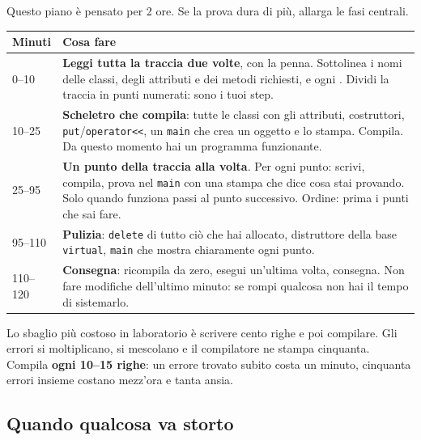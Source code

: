 Questo piano è pensato per 2 ore. Se la prova dura di più, allarga le fasi centrali.

\begin{center}\small
\begin{tabular}{lp{11cm}}
\toprule
\textbf{Minuti} & \textbf{Cosa fare} \\
\midrule
0--10 & \textbf{Leggi tutta la traccia due volte}, con la penna. Sottolinea i nomi delle
        classi, degli attributi e dei metodi richiesti, e ogni \q{deve}. Dividi la traccia
        in punti numerati: sono i tuoi step. \\
10--25 & \textbf{Scheletro che compila}: tutte le classi con gli attributi, costruttori,
        \texttt{put}/\texttt{operator<<}, un \texttt{main} che crea un oggetto e lo
        stampa. Compila. Da questo momento hai un programma funzionante. \\
25--95 & \textbf{Un punto della traccia alla volta}. Per ogni punto: scrivi, compila,
        prova nel \texttt{main} con una stampa che dice cosa stai provando. Solo quando
        funziona passi al punto successivo. Ordine: prima i punti che sai fare. \\
95--110 & \textbf{Pulizia}: \texttt{delete} di tutto ciò che hai allocato, distruttore
        della base \texttt{virtual}, \texttt{main} che mostra chiaramente ogni punto. \\
110--120 & \textbf{Consegna}: ricompila da zero, esegui un'ultima volta, consegna.
        Non fare modifiche dell'ultimo minuto: se rompi qualcosa non hai il tempo di
        sistemarlo. \\
\bottomrule
\end{tabular}
\end{center}

\begin{trappola}
Lo sbaglio più costoso in laboratorio è scrivere cento righe e poi compilare. Gli errori
si moltiplicano, si mescolano e il compilatore ne stampa cinquanta. Compila \textbf{ogni
10--15 righe}: un errore trovato subito costa un minuto, cinquanta errori insieme costano
mezz'ora e tanta ansia.
\end{trappola}

\subsection*{Quando qualcosa va storto}

